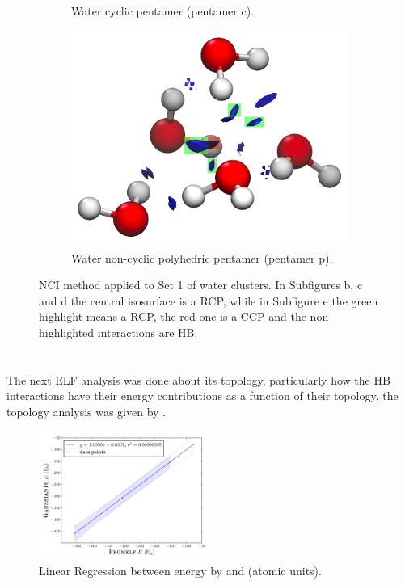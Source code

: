 \begin{figure}[h!]
\begin{subfigure}[b]{0.4\linewidth}
    \caption{Water cyclic pentamer (pentamer c).}
    \label{penta_c_nci}
  \end{subfigure}
  \begin{subfigure}[b]{0.4\linewidth}
    \includegraphics[width=\linewidth]{4/plots/nci/new/pentamer_pNCI}
    \caption{Water non-cyclic polyhedric pentamer (pentamer p).}
    \label{penta_p_nci}
  \end{subfigure}
  \caption{NCI method applied to Set 1 of water clusters. In Subfigures b, c and d the central isosurface is a RCP, while in
  Subfigure e the
  green highlight means a RCP, the red one is a CCP and the non highlighted interactions are HB.}
  \label{NCI}
\end{figure}


\clearpage

\section{{}}

The next ELF analysis was done about its topology, particularly how the HB
interactions have their energy contributions as a function of their topology,
the topology analysis was given by {}.

\begin{figure}
    \centering
    \includegraphics[width=0.5\textwidth]{4/plots/promelf/wfn_vs_promelf.pdf}
    \caption{Linear Regression between energy by {} and {} (atomic units).}
\label{rl_wfn}
\end{figure}

